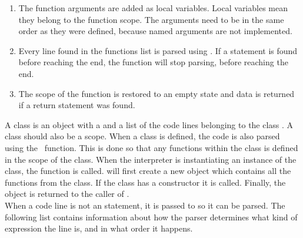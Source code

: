 \begin{enumerate}
    \item The function arguments are added as local variables. Local variables mean they belong to the function scope. The arguments need to be in the same order as they were defined, because named arguments are not implemented.
    \item Every line found in the functions  list is parsed using . If a  statement is found before reaching the end, the function will stop parsing, before reaching the end.
    \item The scope of the function is restored to an empty state and data is returned if a return statement was found.
\end{enumerate}
A class is an object with a  and a list of the code lines belonging to the class . A class should also be a scope. When a class is defined, the code is also parsed using the  function. This is done so that any functions within the class is defined in the scope of the class. When the interpreter is instantiating an instance of the class, the  function is called.  will first create a new object which contains all the functions from the class. If the class has a constructor it is called. Finally, the object is returned to the caller of .
\\[11pt]
When a code line is not an statement, it is passed to  so it can be parsed. The following list contains information about how the parser determines what kind of expression the line is, and in what order it happens.
